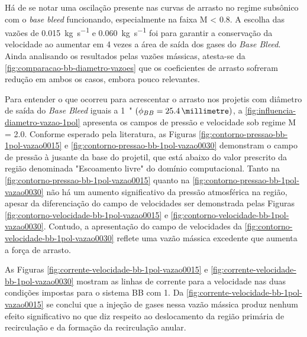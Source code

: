 Há de se notar uma oscilação presente nas curvas de arrasto no regime subsônico com o \textit{base bleed} funcionando, especialmente na faixa M < \num{0,8}. A escolha das vazões de \qty{0,015}{\kilogram\per\second} e \qty{0,060}{\kilogram\per\second} foi para garantir a conservação da velocidade ao aumentar em 4 vezes a área de saída dos gases do \textit{Base Bleed}. Ainda analisando os resultados pelas vazões mássicas, atesta-se da \autoref{fig:comparacao-bb-diametro-vazoes} que os coeficientes de arrasto sofreram redução em ambos os casos, embora pouco relevantes.

Para entender o que ocorreu para acrescentar o arrasto nos projetis com diâmetro de saída do \textit{Base Bleed} iguais a \qty{1}{"} $\left(\phi_{BB} = \qty{25,4}{\millimetre}\right)$, a \autoref{fig:influencia-diametro-vazao-1pol} apresenta os campos de pressão e velocidade sob regime M = \num{2,0}. Conforme esperado pela literatura, as Figuras \ref{fig:contorno-pressao-bb-1pol-vazao0015} e \ref{fig:contorno-pressao-bb-1pol-vazao0030} demonstram o campo de pressão à jusante da base do projetil, que está abaixo do valor prescrito da região denominada "Escoamento livre"{} do domínio computacional. Tanto na \autoref{fig:contorno-pressao-bb-1pol-vazao0015} quanto na \autoref{fig:contorno-pressao-bb-1pol-vazao0030} não há um aumento significativo da pressão atmosférica na região, apesar da diferenciação do campo de velocidades ser demonstrada pelas Figuras \ref{fig:contorno-velocidade-bb-1pol-vazao0015} e \ref{fig:contorno-velocidade-bb-1pol-vazao0030}. Contudo, a apresentação do campo de velocidades da \autoref{fig:contorno-velocidade-bb-1pol-vazao0030} reflete uma vazão mássica excedente que aumenta a força de arrasto.

As Figuras \ref{fig:corrente-velocidade-bb-1pol-vazao0015} e \ref{fig:corrente-velocidade-bb-1pol-vazao0030} mostram as linhas de corrente para a velocidade nas duas condições impostas para o sistema BB com \qty{1}{\polegada}. Da \autoref{fig:corrente-velocidade-bb-1pol-vazao0015} se conclui que a injeção de gases nessa vazão mássica produz nenhum efeito significativo no que diz respeito ao deslocamento da região primária de recirculação e da formação da recirculação anular.

